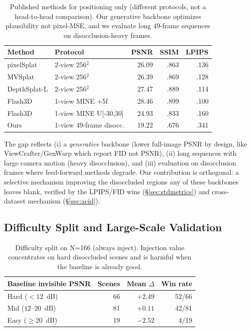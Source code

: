 \documentclass[10pt,twocolumn,letterpaper]{article}
\begin{document}
\begin{table}[t]
\centering\small
\caption{Published methods for positioning only (different protocols, not a
head-to-head comparison). Our generative backbone optimizes plausibility not
pixel-MSE, and we evaluate long 49-frame sequences on disocclusion-heavy frames.}
\begin{tabular}{llrrr}
\toprule
Method & Protocol & PSNR & SSIM & LPIPS \\
\midrule
pixelSplat & 2-view 256$^2$ & 26.09 & .863 & .136 \\
MVSplat & 2-view 256$^2$ & 26.39 & .869 & .128 \\
DepthSplat-L & 2-view 256$^2$ & 27.47 & .889 & .114 \\
Flash3D & 1-view MINE +5f & 28.46 & .899 & .100 \\
Flash3D & 1-view MINE U[-30,30] & 24.93 & .833 & .160 \\
Ours & 1-view 49-frame disocc. & 19.22 & .676 & .341 \\
\bottomrule
\end{tabular}
\end{table}
The gap reflects (i) a \emph{generative} backbone (lower full-image PSNR by
design, like ViewCrafter/GenWarp which report FID not PSNR), (ii) long sequences
with large camera motion (heavy disocclusion), and (iii) evaluation on
disocclusion frames where feed-forward methods degrade. Our contribution is
orthogonal: a selective mechanism improving the disoccluded regions any of these
backbones leaves blank, verified by the LPIPS/FID wins (\S\ref{sec:stdmetrics})
and cross-dataset mechanism (\S\ref{sec:acid}).

\subsection{Difficulty Split and Large-Scale Validation}
\label{sec:scale}
\begin{table}[t]
\centering
\small
\caption{Difficulty split on N=166 (always inject). Injection value concentrates
on hard disoccluded scenes and is harmful when the baseline is already good.}
\begin{tabular}{lrrr}
\toprule
Baseline invisible PSNR & Scenes & Mean $\Delta$ & Win rate \\
\midrule
Hard ($<12$~dB) & 66 & $\mathbf{+2.49}$ & 52/66 \\
Mid ($12$--$20$~dB) & 81 & $+0.11$ & 42/81 \\
Easy ($\ge20$~dB) & 19 & $\mathbf{-2.52}$ & 4/19 \\
\bottomrule
\end{tabular}
\end{table}
\end{document}
